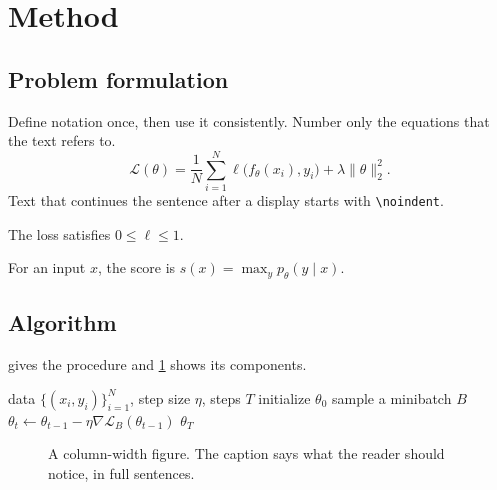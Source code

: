 \documentclass[twocolumn]{ulpaper}
\newcommand{\method}{\textsc{Method}}
\begin{document}
\section{Method}
\label{sec:method}

\subsection{Problem formulation}

Define notation once, then use it consistently. Number only the equations that the text refers to.
\begin{equation}
  \label{eq:objective}
  \mathcal{L}(\theta) = \frac{1}{N}\sum_{i=1}^{N} \ell\bigl(f_\theta(x_i), y_i\bigr) + \lambda \lVert \theta \rVert_2^2 .
\end{equation}
\noindent Text that continues the sentence after a display starts with \verb|\noindent|.

\begin{assumption}
\label{asm:bounded}
The loss satisfies $0 \le \ell \le 1$.
\end{assumption}

\begin{definition}[Score]
\label{def:score}
For an input $x$, the score is $s(x) = \max_{y} p_\theta(y \mid x)$.
\end{definition}

\subsection{Algorithm}

 gives the procedure and \cref{fig:overview} shows its components.

\begin{algorithm}[t]
\caption{Training with \method}
\label{alg:method}
\begin{algorithmic}[1]
\Require data $\{(x_i, y_i)\}_{i=1}^N$, step size $\eta$, steps $T$
\State initialize $\theta_0$
  \State sample a minibatch $B$
  \State $\theta_t \gets \theta_{t-1} - \eta \nabla \mathcal{L}_B(\theta_{t-1})$
\EndFor
\State \Return $\theta_T$
\end{algorithmic}
\end{algorithm}

\begin{figure}[t]
\centering
{}
\caption{A column-width figure. The caption says what the reader should notice, in full sentences.}
\label{fig:overview}
\end{figure}
\end{document}
